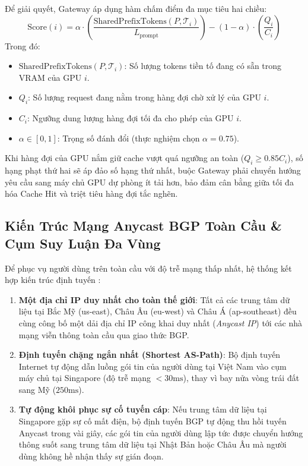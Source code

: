 Để giải quyết, Gateway áp dụng hàm chấm điểm đa mục tiêu hai chiều:
\begin{equation}
\text{Score}(i) = \alpha \cdot \left(\frac{\text{SharedPrefixTokens}(P, \mathcal{T}_i)}{L_{\text{prompt}}}\right) - (1 - \alpha) \cdot \left(\frac{Q_i}{C_i}\right)
\end{equation}
Trong đó:
\begin{itemize}
  \item $\text{SharedPrefixTokens}(P, \mathcal{T}_i)$: Số lượng tokens tiền tố đang có sẵn trong VRAM của GPU $i$.
  \item $Q_i$: Số lượng request đang nằm trong hàng đợi chờ xử lý của GPU $i$.
  \item $C_i$: Ngưỡng dung lượng hàng đợi tối đa cho phép của GPU $i$.
  \item $\alpha \in [0, 1]$: Trọng số đánh đổi (thực nghiệm chọn $\alpha = 0.75$).
\end{itemize}
Khi hàng đợi của GPU nắm giữ cache vượt quá ngưỡng an toàn ($Q_i \ge 0.85 C_i$), số hạng phạt thứ hai sẽ áp đảo số hạng thứ nhất, buộc Gateway phải chuyển hướng yêu cầu sang máy chủ GPU dự phòng ít tải hơn, bảo đảm cân bằng giữa tối đa hóa Cache Hit và triệt tiêu hàng đợi tắc nghẽn.

\subsection{Kiến Trúc Mạng Anycast BGP Toàn Cầu \& Cụm Suy Luận Đa Vùng}
Để phục vụ người dùng trên toàn cầu với độ trễ mạng thấp nhất, hệ thống kết hợp kiến trúc định tuyến :
\begin{enumerate}
  \item \textbf{Một địa chỉ IP duy nhất cho toàn thế giới}: Tất cả các trung tâm dữ liệu tại Bắc Mỹ (us-east), Châu Âu (eu-west) và Châu Á (ap-southeast) đều cùng công bố một dải địa chỉ IP công khai duy nhất (\textit{Anycast IP}) tới các nhà mạng viễn thông toàn cầu qua giao thức BGP.
  \item \textbf{Định tuyến chặng ngắn nhất (Shortest AS-Path)}: Bộ định tuyến Internet tự động dẫn luồng gói tin của người dùng tại Việt Nam vào cụm máy chủ tại Singapore (độ trễ mạng $< 30\text{ms}$), thay vì bay nửa vòng trái đất sang Mỹ ($250\text{ms}$).
  \item \textbf{Tự động khôi phục sự cố tuyến cáp}: Nếu trung tâm dữ liệu tại Singapore gặp sự cố mất điện, bộ định tuyến BGP tự động thu hồi tuyến Anycast trong vài giây, các gói tin của người dùng lập tức được chuyển hướng thông suốt sang trung tâm dữ liệu tại Nhật Bản hoặc Châu Âu mà người dùng không hề nhận thấy sự gián đoạn.
\end{enumerate}

